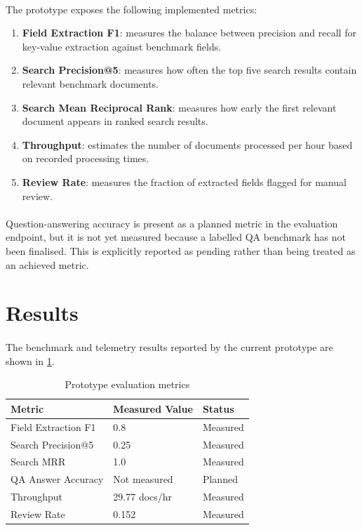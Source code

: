 \paragraph{} The prototype exposes the following implemented metrics:

\begin{enumerate}
    \item \textbf{Field Extraction F1}: measures the balance between precision and recall for key-value extraction against benchmark fields.
    \item \textbf{Search Precision@5}: measures how often the top five search results contain relevant benchmark documents.
    \item \textbf{Search Mean Reciprocal Rank}: measures how early the first relevant document appears in ranked search results.
    \item \textbf{Throughput}: estimates the number of documents processed per hour based on recorded processing times.
    \item \textbf{Review Rate}: measures the fraction of extracted fields flagged for manual review.
\end{enumerate}

\paragraph{} Question-answering accuracy is present as a planned metric in the evaluation endpoint, but it is not yet measured because a labelled QA benchmark has not been finalised. This is explicitly reported as pending rather than being treated as an achieved metric.

\section{Results}
\paragraph{} The benchmark and telemetry results reported by the current prototype are shown in \cref{tab:evaluation_results}.

\begin{table}[h]
\centering
\begin{tabular}{lll}
\toprule
\textbf{Metric} & \textbf{Measured Value} & \textbf{Status} \\
\midrule
Field Extraction F1 & 0.8 & Measured \\
Search Precision@5 & 0.25 & Measured \\
Search MRR & 1.0 & Measured \\
QA Answer Accuracy & Not measured & Planned \\
Throughput & 29.77 docs/hr & Measured \\
Review Rate & 0.152 & Measured \\
\bottomrule
\end{tabular}
\caption{Prototype evaluation metrics}
\label{tab:evaluation_results}
\end{table}


